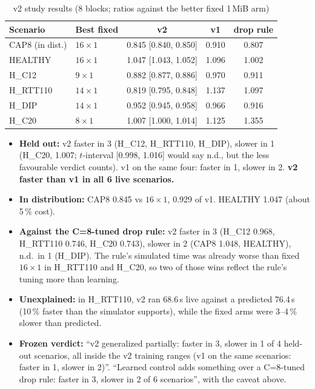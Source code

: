 \begin{table}[H]\centering\small
\caption{v2 study results (8 blocks; ratios against the better fixed 1\,MiB arm)}\label{tab:v2}
\begin{tabular}{@{}llccc@{}}
\toprule
\textbf{Scenario} & \textbf{Best fixed} & \textbf{v2} & \textbf{v1} & \textbf{drop rule}\\
\midrule
CAP8 (in dist.) & $16\times1$ & 0.845 [0.840, 0.850] & 0.910 & 0.807\\
HEALTHY & $16\times1$ & 1.047 [1.043, 1.052] & 1.096 & 1.002\\
H\_C12 & $9\times1$ & 0.882 [0.877, 0.886] & 0.970 & 0.911\\
H\_RTT110 & $14\times1$ & 0.819 [0.795, 0.848] & 1.137 & 1.097\\
H\_DIP & $14\times1$ & 0.952 [0.945, 0.958] & 0.966 & 0.916\\
H\_C20 & $8\times1$ & 1.007 [1.000, 1.014] & 1.125 & 1.355\\
\bottomrule
\end{tabular}
\end{table}
\begin{itemize}
\item \textbf{Held out:} v2 faster in 3 (H\_C12, H\_RTT110, H\_DIP), slower in 1 (H\_C20, 1.007; $t$-interval [0.998, 1.016] would say n.d., but the less favourable verdict counts). v1 on the same four: faster in 1, slower in 2. \textbf{v2 faster than v1 in all 6 live scenarios.}
\item \textbf{In distribution:} CAP8 0.845 vs $16\times1$, 0.929 of v1. HEALTHY 1.047 (about 5\,\% cost).
\item \textbf{Against the C=8-tuned drop rule:} v2 faster in 3 (H\_C12 0.968, H\_RTT110 0.746, H\_C20 0.743), slower in 2 (CAP8 1.048, HEALTHY), n.d.\ in 1 (H\_DIP). The rule's simulated time was already worse than fixed $16\times1$ in H\_RTT110 and H\_C20, so two of those wins reflect the rule's tuning more than learning.
\item \textbf{Unexplained:} in H\_RTT110, v2 ran 68.6\,s live against a predicted 76.4\,s (10\,\% faster than the simulator supports), while the fixed arms were 3--4\,\% slower than predicted.
\item \textbf{Frozen verdict:} ``v2 generalized partially: faster in 3, slower in 1 of 4 held-out scenarios, all inside the v2 training ranges (v1 on the same scenarios: faster in 1, slower in 2)''. ``Learned control adds something over a C=8-tuned drop rule: faster in 3, slower in 2 of 6 scenarios'', with the caveat above.
\end{itemize}


